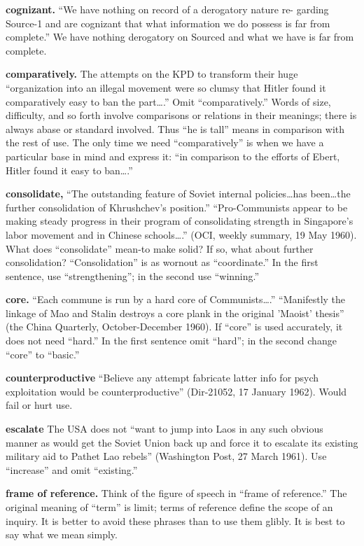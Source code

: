 \documentclass[
    oneside,
    11pt,
    draft
]{memoir}
\begin{document}
\textbf{cognizant.} \enquote{We have nothing on record of a derogatory nature re- garding Source-1 and are cognizant that what information we do possess is far from complete.} We have nothing derogatory on Sourced and what we have is far from complete.

\textbf{comparatively.} The attempts on the KPD to transform their huge \enquote{organization into an illegal movement were so clumsy that Hitler found it comparatively easy to ban the part\dots.} Omit \enquote{comparatively.} Words of size, difficulty, and so forth involve comparisons or relations in their meanings; there is always abase or standard involved. Thus \enquote{he is tall} means in comparison with the rest of use. The only time we need \enquote{comparatively} is when we have a particular base in mind and express it: \enquote{in comparison to the efforts of Ebert, Hitler found it easy to ban\dots.}

\textbf{consolidate,} \enquote{The outstanding feature of Soviet internal policies\dots has been\dots the further consolidation of Khrushchev's position.} \enquote{Pro-Communists appear to be making steady progress in their program of consolidating strength in Singapore's labor movement and in Chinese schools\dots.} (OCI, weekly summary, 19 May 1960). What does \enquote{consolidate} mean-to make solid? If so, what about further consolidation? \enquote{Consolidation} is as wornout as \enquote{coordinate.} In the first sentence, use \enquote{strengthening}; in the second use \enquote{winning.}

\textbf{core.} \enquote{Each commune is run by a hard core of Communists\dots.} \enquote{Manifestly the linkage of Mao and Stalin destroys a core plank in the original 'Maoist' thesis} (the China Quarterly, October-December 1960). If \enquote{core} is used accurately, it does not need \enquote{hard.} In the first sentence omit \enquote{hard}; in the second change \enquote{core} to \enquote{basic.}

\textbf{counterproductive} \enquote{Believe any attempt fabricate latter info for psych exploitation would be counterproductive} (Dir-21052, 17 January 1962). Would fail or hurt use.

\textbf{escalate} The USA does not \enquote{want to jump into Laos in any such obvious manner as would get the Soviet Union back up and force it to escalate its existing military aid to Pathet Lao rebels} (Washington Post, 27 March 1961). Use \enquote{increase} and omit \enquote{existing.}

\textbf{frame of reference.} Think of the figure of speech in \enquote{frame of reference.} The original meaning of \enquote{term} is limit; terms of reference define the scope of an inquiry. It is better to avoid these phrases than to use them glibly. It is best to say what we mean simply.
\end{document}
